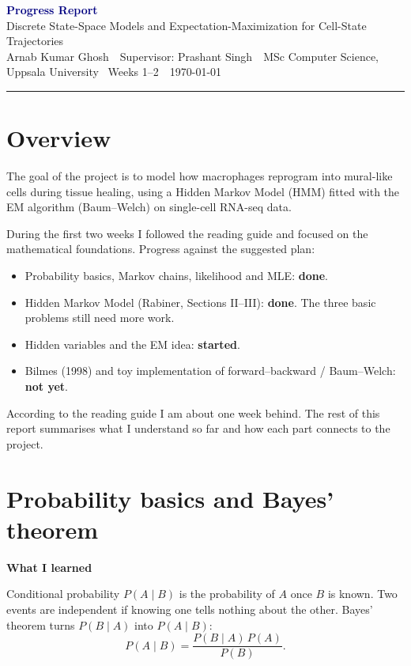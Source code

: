 \documentclass[10pt,a4paper]{article}
\newcommand{\myname}{Arnab Kumar Ghosh}
\newcommand{\reporttitle}{Progress Report}
\newcommand{\projecttitle}{Discrete State-Space Models and Expectation-Maximization for Cell-State Trajectories}
\newcommand{\supervisor}{Prashant Singh}
\newcommand{\period}{Weeks 1--2}
\newcommand{\reportdate}{\today}
\newcommand{\sub}[1]{\vspace{1pt}\textbf{\textcolor{gray!80!black}{#1}}\par}
\begin{document}
\begin{center}
  {\Large\bfseries\textcolor{navy}{\reporttitle}}\\[2pt]
  {\projecttitle}\\[3pt]
  {\small \myname\ \textperiodcentered\ Supervisor: \supervisor\ \textperiodcentered\ MSc Computer Science, Uppsala University \textperiodcentered\ \period\ \textperiodcentered\ \reportdate}
\end{center}
\vspace{-2pt}
\hrule
\vspace{4pt}

\section*{Overview}

The goal of the project is to model how macrophages reprogram into mural-like cells during tissue healing, using a Hidden Markov Model (HMM) fitted with the EM algorithm (Baum--Welch) on single-cell RNA-seq data.

During the first two weeks I followed the reading guide and focused on the mathematical foundations. Progress against the suggested plan:

\begin{itemize}
  \item Probability basics, Markov chains, likelihood and MLE: \textbf{done}.
  \item Hidden Markov Model (Rabiner, Sections II--III): \textbf{done}. The three basic problems still need more work.
  \item Hidden variables and the EM idea: \textbf{started}.
  \item Bilmes (1998) and toy implementation of forward--backward / Baum--Welch: \textbf{not yet}.
\end{itemize}

According to the reading guide I am about one week behind. The rest of this report summarises what I understand so far and how each part connects to the project.

\section{Probability basics and Bayes' theorem}

\sub{What I learned}
Conditional probability $P(A \mid B)$ is the probability of $A$ once $B$ is known. Two events are independent if knowing one tells nothing about the other. Bayes' theorem turns $P(B \mid A)$ into $P(A \mid B)$:
\[
P(A \mid B) = \frac{P(B \mid A)\,P(A)}{P(B)}.
\]
\end{document}
